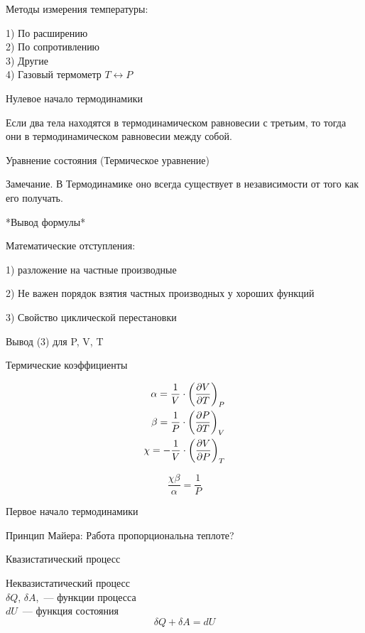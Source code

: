 \documentclass[../main.tex]{subfiles}
\begin{document}
    Методы измерения температуры:
    
        1) По расширению\\
        2) По сопротивлению\\
        3) Другие\\
        4) Газовый термометр $T \leftrightarrow P$

    Нулевое начало термодинамики

    Если два тела находятся в термодинамическом равновесии с третьим, то тогда они в термодинамическом равновесии между собой.
    
    Уравнение состояния (Термическое уравнение)

    Замечание. В Термодинамике оно всегда существует в независимости от того как его получать.

    *Вывод формулы*

    Математические отступления:

        1) разложение на частные производные

        2) Не важен порядок взятия частных производных у хороших функций

        3) Свойство циклической перестановки

    Вывод (3) для P, V, T

    Термические коэффициенты

    \begin{eqnarray}
        \alpha  =   \frac{1}{V} \cdot \left(\frac{\partial V}{\partial T}\right)_{P} \\
        \beta   =   \frac{1}{P} \cdot \left(\frac{\partial P}{\partial T}\right)_{V} \\
        \chi    = - \frac{1}{V} \cdot \left(\frac{\partial V}{\partial P}\right)_{T}
    \end{eqnarray}

    \begin{equation}
        \frac{\chi \beta}{\alpha} = \frac{1}{P}
    \end{equation}

    Первое начало термодинамики 

    Принцип Майера: Работа пропорциональна теплоте?

    Квазистатический процесс

    Неквазистатический процесс\\
    $\delta Q$, $\delta A$,~--- функции процесса\\
    $dU$~--- функция состояния\\

    $$ \delta Q + \delta A = dU$$
\end{document}
